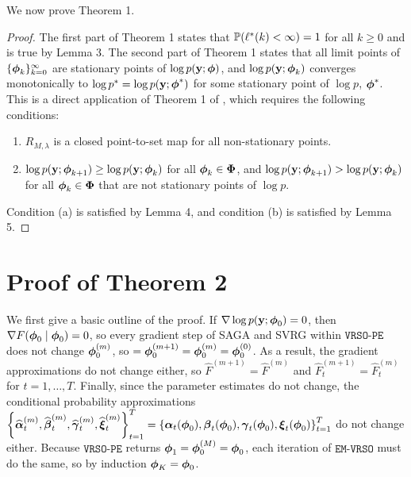 We now prove Theorem 1.

\begin{proof}

The first part of Theorem 1 states that $\mathbb{P}(\ell^*(k) < \infty) = 1$ for all $k \geq 0$ and is true by Lemma 3. The second part of Theorem 1 states that all limit points of $\{\boldsymbol{\phi}_{k}\}_{k=0}^\infty$ are stationary points of $\log p(\mathbf{y};\boldsymbol{\phi})$, and $\log p(\mathbf{y};\boldsymbol{\phi}_{k})$ converges monotonically to $\log p^* = \log p(\mathbf{y};\boldsymbol{\phi}^*)$ for some stationary point of $\log p$, $\boldsymbol{\phi}^*$. This is a direct application of Theorem 1 of \citet{Wu:1983}, which requires the following conditions:

\begin{enumerate}[label=(\alph*)]
    \item $R_{M,\lambda}$ is a closed point-to-set map for all non-stationary points.
    \item $\log p(\mathbf{y};\boldsymbol{\phi}_{k+1}) \geq \log p(\mathbf{y};\boldsymbol{\phi}_k)$ for all $\boldsymbol{\phi}_k  \in \boldsymbol{\Phi}$, and $\log p(\mathbf{y};\boldsymbol{\phi}_{k+1}) > \log p(\mathbf{y};\boldsymbol{\phi}_k)$ for all $\boldsymbol{\phi}_k \in \boldsymbol{\Phi}$ that are not stationary points of $\log p$.
\end{enumerate}

Condition (a) is satisfied by Lemma 4, and condition (b) is satisfied by Lemma 5. 
%
\end{proof}

\section{Proof of Theorem 2}

We first give a basic outline of the proof. If $\nabla \log p(\mathbf{y};\boldsymbol{\phi}_0) = 0$, then $\nabla F(\boldsymbol{\phi}_0 \mid \boldsymbol{\phi}_0) = 0$, so every gradient step of SAGA and SVRG within $\texttt{VRSO-PE}$ does not change $\boldsymbol{\phi}_0^{(m)}$, so $ = \boldsymbol{\phi}_0^{(m+1)} =  \boldsymbol{\phi}_0^{(m)} = \boldsymbol{\phi}^{(0)}_0$. As a result, the gradient approximations do not change either, so $\widehat F^{(m+1)} = \widehat F^{(m)}$ and $\widehat F^{(m+1)}_t = \widehat F^{(m)}_t$ for $t = 1,\ldots,T$. Finally, since the parameter estimates do not change, the conditional probability approximations $\left\{\widehat {\boldsymbol{\alpha}}^{(m)}_t, \widehat {\boldsymbol{\beta}}^{(m)}_t, \widehat {\boldsymbol{\gamma}}^{(m)}_t, \widehat {\boldsymbol{\xi}}^{(m)}_t\right\}_{t=1}^T = \left\{\boldsymbol{\alpha}_t(\boldsymbol{\phi}_0), \boldsymbol{\beta}_t(\boldsymbol{\phi}_0), \boldsymbol{\gamma}_t(\boldsymbol{\phi}_0), \boldsymbol{\xi}_t(\boldsymbol{\phi}_0) \right\}_{t=1}^T$ do not change either. Because $\texttt{VRSO-PE}$ returns $\boldsymbol{\phi}_1 = \boldsymbol{\phi}_0^{(M)} = \boldsymbol{\phi}_0$, each iteration of $\texttt{EM-VRSO}$ must do the same, so by induction $\boldsymbol{\phi}_K = \boldsymbol{\phi}_0$.

